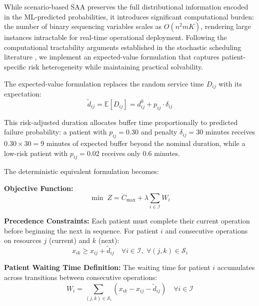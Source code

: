 \documentclass[11pt,a4paper]{article}
\begin{document}
While scenario-based SAA preserves the full distributional information encoded in the ML-predicted probabilities, it introduces significant computational burden: the number of binary sequencing variables scales as $O(n^2 m K)$, rendering large instances intractable for real-time operational deployment. Following the computational tractability arguments established in the stochastic scheduling literature \citep{denton2003sequential, mancilla2012sample}, we implement an expected-value formulation that captures patient-specific risk heterogeneity while maintaining practical solvability.

The expected-value formulation replaces the random service time $D_{ij}$ with its expectation:
\begin{equation}
\tilde{d}_{ij} = \mathbb{E}[D_{ij}] = d_{ij}^0 + p_{ij} \cdot \delta_{ij}
\label{eq:expected_duration}
\end{equation}

This risk-adjusted duration allocates buffer time proportionally to predicted failure probability: a patient with $p_{ij} = 0.30$ and penalty $\delta_{ij} = 30$ minutes receives $0.30 \times 30 = 9$ minutes of expected buffer beyond the nominal duration, while a low-risk patient with $p_{ij} = 0.02$ receives only 0.6 minutes.

The deterministic equivalent formulation becomes:

\textbf{Objective Function:}
\begin{equation}
\min \; Z = C_{\max} + \lambda \sum_{i \in \mathcal{I}} W_i
\label{eq:objective}
\end{equation}

\textbf{Precedence Constraints:} Each patient must complete their current operation before beginning the next in sequence. For patient $i$ and consecutive operations on resources $j$ (current) and $k$ (next):
\begin{equation}
x_{ik} \geq x_{ij} + \tilde{d}_{ij} \quad \forall i \in \mathcal{I}, \; \forall (j, k) \in \mathcal{S}_i
\label{eq:precedence}
\end{equation}

\textbf{Patient Waiting Time Definition:} The waiting time for patient $i$ accumulates across transitions between consecutive operations:
\begin{equation}
W_i = \sum_{(j,k) \in \mathcal{S}_i} \left( x_{ik} - x_{ij} - \tilde{d}_{ij} \right) \quad \forall i \in \mathcal{I}
\label{eq:wait_time}
\end{equation}
\end{document}
